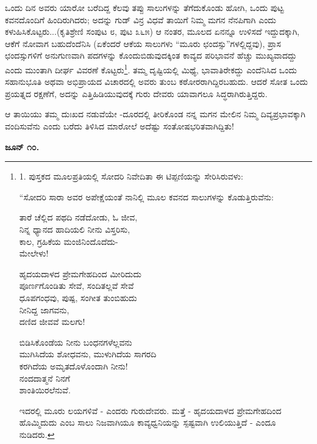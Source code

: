 ಒಂದು ದಿನ ಅವರು ಯಾರೋ ಬರೆದಿದ್ದ ಕೆಲವು ತಪ್ಪು ಸಾಲುಗಳನ್ನು ತೆಗೆದುಕೊಂಡು ಹೋಗಿ, ಒಂದು ಪುಟ್ಟ ಕವನದೊಂದಿಗೆ ಹಿಂದಿರುಗಿದರು; ಅದನ್ನು ಗುಡ್ ವಿನ್ರ ವಿಧವೆ ತಾಯಿಗೆ ನಿಮ್ಮ ಮಗನ ನೆನಪಿಗಾಗಿ ಎಂದು ಕಳುಹಿಸಿಕೊಟ್ಟರು...(ಕೃತಿಶ್ರೇಣಿ ಸಂಪುಟ ೮, ಪುಟ ೩೬೫) ಆ ನಂತರ, ಮೂಲದ ಏನನ್ನೂ ಉಳಿಸದೆ ಇದ್ದುದಕ್ಕಾಗಿ, ಆಕೆಗೆ ನೋವಾಗ ಬಹುದೆಂದೆನಿಸಿ (ಏಕೆಂದರೆ ಆಕೆಯ ಸಾಲುಗಳು “ಮೂರು ಛಂದಸ್ಸು”ಗಳಲ್ಲಿದ್ದವು), ಪ್ರಾಸ ಛಂದಸ್ಸುಗಳಿಗೆ ಅನುಗುಣವಾಗಿ ಪದಗಳನ್ನು ಕೊಂದುಬಿಡುವುದಕ್ಕಿಂತ ಕಾವ್ಯದ ಪರಿಭಾವನೆ ಹೆಚ್ಚು ಮುಖ್ಯವಾದದ್ದು ಎಂದು ಮುಂತಾಗಿ ದೀರ್ಘ ವಿವರಣೆ ಕೊಟ್ಟರು\footnote{1. ಪುಸ್ತಕದ ಮೂಲಪ್ರತಿಯಲ್ಲಿ ಸೋದರಿ ನಿವೇದಿತಾ ಈ ಟಿಪ್ಪಣಿಯನ್ನು ಸೇರಿಸಿರುವಳು:

“ಸೋದರಿ ಸಾರಾ ಅವರ ಅಪೇಕ್ಷೆಯಂತೆ ನಾನಿಲ್ಲಿ ಮೂಲ ಕವನದ ಸಾಲುಗಳನ್ನು ಕೊಡುತ್ತಿರುವೆನು:

\begin{myquote}
ತಾರೆ ಚೆಲ್ಲಿದ ಪಥದಿ ನಡೆದೋಡು, ಓ ಜೀವ,\\ನಿನ್ನ ಧ್ಯಾನದ ಹಾದಿಯಲಿ ನೀನು ವಿಸ್ತರಿಸು,\\ಕಾಲ, ಗ್ರಹಿಕೆಯ ಮಂಜಿನಿಂದೊದೆದು-\\ಮೇಲೇಳು!
\end{myquote}

\begin{myquote}
ಹೃದಯದಾಳದ ಪ್ರೇಮಗೇಹದಿಂದ ಮೀರಿದುದು\\ಪೂರ್ಣಗೊಂಡಿತು ಸೇವೆ, ಸಂದಿತಲ್ಲವೆ ಸೇವೆ\\ಧೂಪಗಂಧವು, ಪುಷ್ಪ, ಸಂಗೀತ ತುಂಬಿಹುದು\\ನೀನಿದ್ದ ಜಾಗವನು,\\ದಣಿದ ಜೀವವೆ ಮಲಗು!
\end{myquote}

\begin{myquote}
ಬಿಡಿಸಿಕೊಂಡೆಯ ನೀನು ಬಂಧನಗಳೆಲ್ಲವನು\\ಮುಗಿಸಿದೆಯ ಶೋಧವನು, ಮುಳುಗಿದೆಯ ಸಾಗರದಿ\\ಕರಗಿದೆಯ ಅಮೃತದೊಳೊಂದಾಗಿ ನೀನು!\\ನಂದದಾತ್ಮನೆ ನಿನಗೆ\\ಶಾಂತಿಯಿರಲೆನುವೆ.
\end{myquote}

ಇದರಲ್ಲಿ ಮೂರು ಲಯಗಳಿವೆ - ಎಂದರು ಗುರುದೇವರು. ಮತ್ತೆ - ಹೃದಯದಾಳದ ಪ್ರೇಮಗೇಹದಿಂದ ಹೊಮ್ಮಿದುದು ಎಂಬ ಸಾಲು ನಿಜವಾಗಿಯೂ ಕಾವ್ಯಧ್ವನಿಯನ್ನು ಸ್ಪಷ್ಟವಾಗಿ ಉಲಿಯುತ್ತಿದೆ - ಎಂದೂ ನುಡಿದರು.}. ತಮ್ಮ ದೃಷ್ಟಿಯಲ್ಲಿ ಮಿಥ್ಯೆ, ಭಾವಾತಿರೇಕದ್ದು ಎಂದೆನಿಸಿದ ಒಂದು ಸಹಾನುಭೂತಿ ಅಥವಾ ಅಭಿಪ್ರಾಯದ ವಿಚಾರದಲ್ಲಿ ಅವರು ತುಂಬ ಕಠೋರರಾಗಿದ್ದಿರಬಹುದು. ಆದರೆ ಸೋತ ಒಂದು ಪ್ರಯತ್ನದ ರಕ್ಷಣೆಗೆ, ಅದನ್ನು ಎತ್ತಿಹಿಡಿಯುವುದಕ್ಕೆ ಗುರು ದೇವರು ಯಾವಾಗಲೂ ಸಿದ್ಧರಾಗಿರುತ್ತಿದ್ದರು.

ಆ ತಾಯಿಯು ತಮ್ಮ ದುಃಖದ ನಡುವೆಯೇ -ದೂರದಲ್ಲಿ ತೀರಿಕೊಂಡ ನನ್ನ ಮಗನ ಮೇಲಿನ ನಿಮ್ಮ ದಿವ್ಯಪ್ರಭಾವಕ್ಕಾಗಿ ವಂದಿಸುವೆನು ಎಂದು ಬರೆದು ತಿಳಿಸಿದ ಮಾರೋಲೆ ಅದೆಷ್ಟು ಸಂತೋಷಭರಿತವಾಗಿದ್ದಿತು!

\textbf{ಜೂನ್ ೧೦.}

